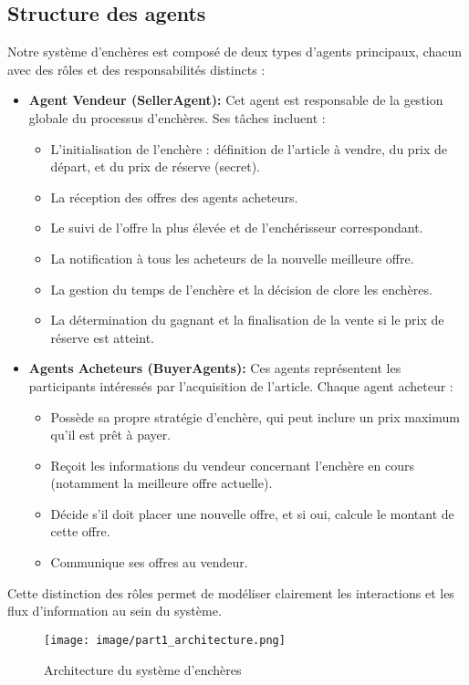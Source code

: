 \documentclass[a4paper,12pt]{report}
\begin{document}
\subsection{Structure des agents}
Notre système d'enchères est composé de deux types d'agents principaux, chacun avec des rôles et des responsabilités distincts :
\begin{itemize}
    \item \textbf{Agent Vendeur (SellerAgent):} Cet agent est responsable de la gestion globale du processus d'enchères. Ses tâches incluent :
        \begin{itemize}
            \item L'initialisation de l'enchère : définition de l'article à vendre, du prix de départ, et du prix de réserve (secret).
            \item La réception des offres des agents acheteurs.
            \item Le suivi de l'offre la plus élevée et de l'enchérisseur correspondant.
            \item La notification à tous les acheteurs de la nouvelle meilleure offre.
            \item La gestion du temps de l'enchère et la décision de clore les enchères.
            \item La détermination du gagnant et la finalisation de la vente si le prix de réserve est atteint.
        \end{itemize}
    \item \textbf{Agents Acheteurs (BuyerAgents):} Ces agents représentent les participants intéressés par l'acquisition de l'article. Chaque agent acheteur :
        \begin{itemize}
            \item Possède sa propre stratégie d'enchère, qui peut inclure un prix maximum qu'il est prêt à payer.
            \item Reçoit les informations du vendeur concernant l'enchère en cours (notamment la meilleure offre actuelle).
            \item Décide s'il doit placer une nouvelle offre, et si oui, calcule le montant de cette offre.
            \item Communique ses offres au vendeur.
        \end{itemize}
\end{itemize}
Cette distinction des rôles permet de modéliser clairement les interactions et les flux d'information au sein du système.
\begin{figure}[H]
    \centering
    \texttt{[image: image/part1\_architecture.png]}
    \caption{Architecture du système d'enchères}
\end{figure}
\end{document}
